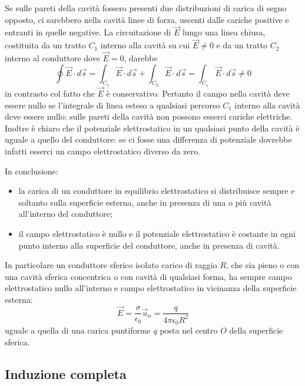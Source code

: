 \documentclass[class=book, crop=false, oneside, 12pt]{standalone}
\begin{document}
Se sulle pareti della cavità fossero presenti due distribuzioni di carica di segno opposto, ci sarebbero nella cavità linee di forza, uscenti dalle cariche positive e entranti in quelle negative. 
La circuitazione di \(\overrightarrow{E}\) lungo una linea chiusa, costituita da un tratto \(C_1\) interno alla cavità su cui \(\overrightarrow{E} \neq 0\) e da un tratto \(C_2\) interno al conduttore dove \(\overrightarrow{E} = 0\), darebbe
\begin{equation*}
    \oint \overrightarrow{E} \cdot d \overrightarrow{s} = \int_{C_1} \overrightarrow{E} \cdot d \overrightarrow{s} + \int_{C_2} \overrightarrow{E} \cdot d \overrightarrow{s} = \int_{C_1} \overrightarrow{E} \cdot d \overrightarrow{s} \neq 0
\end{equation*}
in contrasto col fatto che \(\overrightarrow{E}\) è conservativo. 
Pertanto il campo nella cavità deve essere nullo se l'integrale di linea esteso a qualsiasi percorso \(C_1\) interno alla cavità deve essere nullo: sulle pareti della cavità non possono esserci cariche elettriche.
Inoltre è chiaro che il potenziale elettrostatico in un qualsiasi punto della cavità è uguale a quello del conduttore: se ci fosse una differenza di potenziale dovrebbe infatti esserci un campo elettrostatico diverso da zero. 

In conclusione:
\begin{itemize}
    \item la carica di un conduttore in equilibrio elettrostatico si distribuisce sempre e soltanto sulla superficie esterna, anche in presenza di una o più cavità all'interno del conduttore; 
    \item il campo elettrostatico è nullo e il potenziale elettrostatico è costante in ogni punto interno alla superficie del conduttore, anche in presenza di cavità.
\end{itemize}

In particolare un conduttore sferico isolato carico di raggio \(R\), che sia pieno o con una cavità sferica concentrica o con cavità di qualsiasi forma, ha sempre campo elettrostatico nullo all'interno e campo elettrostatico in vicinanza della superficie esterna:
\begin{equation*}
    \overrightarrow{E} = \frac{\sigma}{\epsilon_0} \overrightarrow{u}_n = \frac{q}{4 \pi \epsilon_0 R^2}
\end{equation*}
uguale a quella di una carica puntiforme \(q\) posta nel centro \(O\) della superficie sferica. 

\subsection{Induzione completa}
\end{document}
